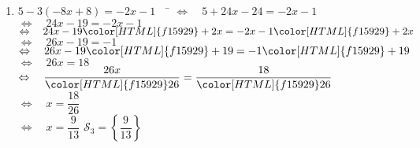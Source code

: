 \documentclass[a4paper,11pt,exos]{nsi} %
\begin{document}
\begin{enumerate}
    \item 	\begin{tabbing}
        $ 5-3(-8x+8)=-2x-1 \quad$		\=	$\Leftrightarrow\quad 5+24x-24=-2x-1 $\\
        \>	$\Leftrightarrow\quad   24x-19=-2x-1 $\\
        \>	$\Leftrightarrow\quad   24x-19{\color[HTML]{f15929}+2x}=-2x-1{\color[HTML]{f15929}+2x} $\\
        \>	$\Leftrightarrow\quad   26x-19=-1 $\\
        \>	$\Leftrightarrow\quad	26x-19{\color[HTML]{f15929}+19}=-1{\color[HTML]{f15929}+19} $\\
        \>	$\Leftrightarrow\quad	26x=18 $\\
        \>	$\Leftrightarrow\quad	\dfrac{26x}{\color[HTML]{f15929}26}=\dfrac{18}{\color[HTML]{f15929}26} $\\[.5em]
        \>	$\Leftrightarrow\quad	x=\dfrac{18}{26} $\\[.5em]
        \>	$\Leftrightarrow\quad	x=\dfrac{9}{13} $ \hspace{4cm} $\mathcal{S}_3=\left\{ \dfrac{9}{13} \right\}$
    \end{tabbing}
\end{enumerate}
\end{document}
